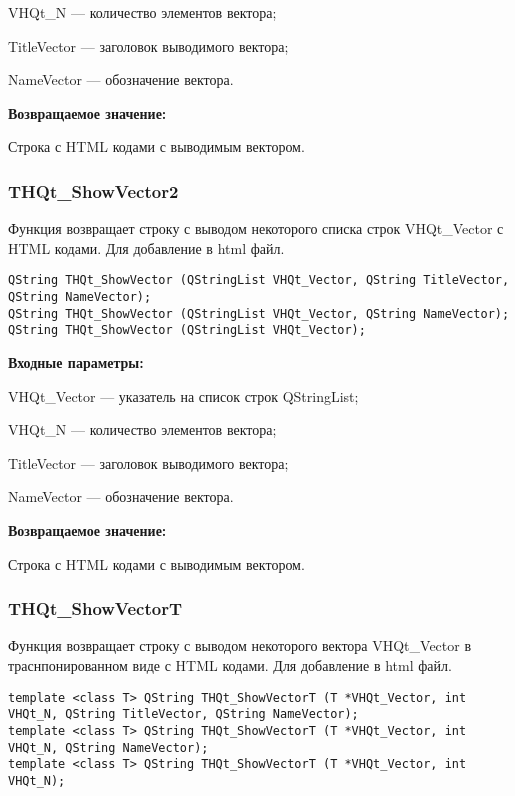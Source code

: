 \documentclass[a4paper,12pt]{article}
\begin{document}
    VHQt\_N --- количество элементов вектора;
 
    TitleVector --- заголовок выводимого вектора;
 
    NameVector --- обозначение вектора.

\textbf{Возвращаемое значение:}

Строка с HTML кодами с выводимым вектором.


\subsubsection{THQt\_ShowVector2}\label{THQt_ShowVector2}

Функция возвращает строку с выводом некоторого списка строк VHQt\_Vector с HTML кодами. Для добавление в html файл.


\begin{lstlisting}[label=code_syntax_THQt_ShowVector2,caption=Синтаксис]
QString THQt_ShowVector (QStringList VHQt_Vector, QString TitleVector, QString NameVector);
QString THQt_ShowVector (QStringList VHQt_Vector, QString NameVector);
QString THQt_ShowVector (QStringList VHQt_Vector);
\end{lstlisting}

\textbf{Входные параметры:}
 
VHQt\_Vector --- указатель на список строк QStringList;
 
    VHQt\_N --- количество элементов вектора;
 
    TitleVector --- заголовок выводимого вектора;
 
    NameVector --- обозначение вектора.

\textbf{Возвращаемое значение:}

Строка с HTML кодами с выводимым вектором.


\subsubsection{THQt\_ShowVectorT}\label{THQt_ShowVectorT}

Функция возвращает строку с выводом некоторого вектора VHQt\_Vector в траснпонированном виде с HTML кодами. Для добавление в html файл.


\begin{lstlisting}[label=code_syntax_THQt_ShowVectorT,caption=Синтаксис]
template <class T> QString THQt_ShowVectorT (T *VHQt_Vector, int VHQt_N, QString TitleVector, QString NameVector);
template <class T> QString THQt_ShowVectorT (T *VHQt_Vector, int VHQt_N, QString NameVector);
template <class T> QString THQt_ShowVectorT (T *VHQt_Vector, int VHQt_N);
\end{lstlisting}
\end{document}
